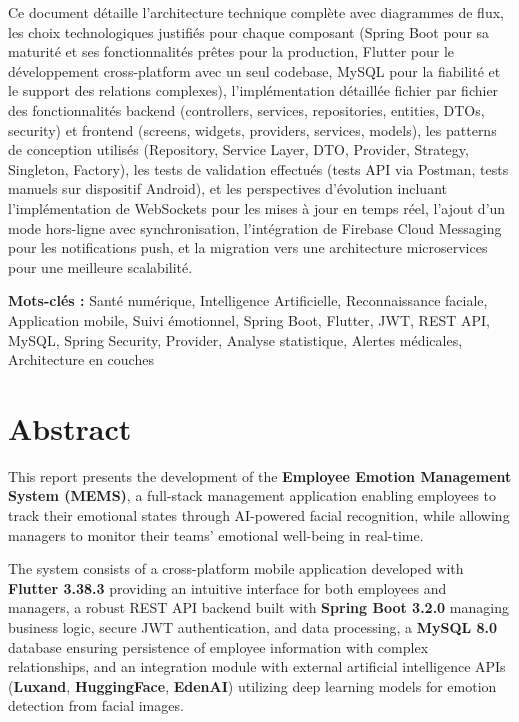 \documentclass[a4paper,11pt]{report}
\begin{document}
Ce document détaille l'architecture technique complète avec diagrammes de flux, les choix technologiques justifiés pour chaque composant (Spring Boot pour sa maturité et ses fonctionnalités prêtes pour la production, Flutter pour le développement cross-platform avec un seul codebase, MySQL pour la fiabilité et le support des relations complexes), l'implémentation détaillée fichier par fichier des fonctionnalités backend (controllers, services, repositories, entities, DTOs, security) et frontend (screens, widgets, providers, services, models), les patterns de conception utilisés (Repository, Service Layer, DTO, Provider, Strategy, Singleton, Factory), les tests de validation effectués (tests API via Postman, tests manuels sur dispositif Android), et les perspectives d'évolution incluant l'implémentation de WebSockets pour les mises à jour en temps réel, l'ajout d'un mode hors-ligne avec synchronisation, l'intégration de Firebase Cloud Messaging pour les notifications push, et la migration vers une architecture microservices pour une meilleure scalabilité.

\textbf{Mots-clés :} Santé numérique, Intelligence Artificielle, Reconnaissance faciale, Application mobile, Suivi émotionnel, Spring Boot, Flutter, JWT, REST API, MySQL, Spring Security, Provider, Analyse statistique, Alertes médicales, Architecture en couches

\newpage
\thispagestyle{empty}

\section*{Abstract}

This report presents the development of the \textbf{Employee Emotion Management System (MEMS)}, a full-stack management application enabling employees to track their emotional states through AI-powered facial recognition, while allowing managers to monitor their teams' emotional well-being in real-time.

The system consists of a cross-platform mobile application developed with \textbf{Flutter 3.38.3} providing an intuitive interface for both employees and managers, a robust REST API backend built with \textbf{Spring Boot 3.2.0} managing business logic, secure JWT authentication, and data processing, a \textbf{MySQL 8.0} database ensuring persistence of employee information with complex relationships, and an integration module with external artificial intelligence APIs (\textbf{Luxand}, \textbf{HuggingFace}, \textbf{EdenAI}) utilizing deep learning models for emotion detection from facial images.
\end{document}
